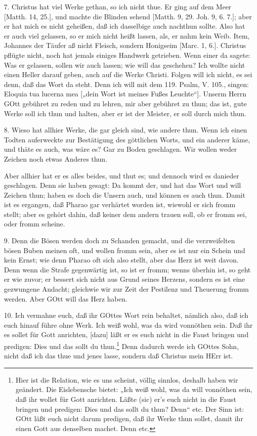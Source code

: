7. Christus hat viel Werke gethan, so ich nicht thue. Er ging auf dem Meer [Matth. 14, 25.], und machte die Blinden sehend [Matth. 9, 29. Joh. 9, 6. 7.]; aber er hat mich es nicht geheißen, daß ich dasselbige auch nachthun sollte. Also hat er auch viel gelassen, so er mich nicht heißt lassen, als, er nahm kein Weib. Item, Johannes der Täufer aß nicht Fleisch, sondern Honigseim [Marc. 1, 6.]. Christus pflügte nicht, noch hat jemals einiges Handwerk getrieben. Wenn einer da sagete: Was er gelassen, sollen wir auch lassen; wie will das geschehen? Ich wollte nicht einen Heller darauf geben, auch auf die Werke Christi. Folgen will ich nicht, es sei denn, daß das Wort da steht. Denn ich will mit dem 119. Psalm, V. 105., singen: Eloquia tua lucerna mea [„dein Wort ist meines Fußes Leuchte“]. Unserm Herrn GOtt gebühret zu reden und zu lehren, mir aber gebühret zu thun; das ist, gute Werke soll ich thun und halten, aber er ist der Meister, er soll durch mich thun.

8. Wieso hat allhier Werke, die gar gleich sind, wie andere thun. Wenn ich einen Todten auferweckte zur Bestätigung des göttlichen Worts, und ein anderer käme, und thäte es auch, was wäre es? Gar zu Boden geschlagen. Wir wollen weder Zeichen noch etwas Anderes thun.

Aber allhier hat er es alles beides, und thut es; und dennoch wird es danieder geschlagen. Denn sie haben gesagt: Da kommt der, und hat das Wort und will Zeichen thun; haben es doch die Unsern auch, und können es auch thun. Damit ist es ergangen, daß Pharao gar verhärtet worden ist, wiewohl er sich fromm stellt; aber es gehört dahin, daß keiner dem andern trauen soll, ob er fromm sei, oder fromm scheine.

9. Denn die Bösen werden doch zu Schanden gemacht, und die verzweifelten bösen Buben meinen oft, und wollen fromm sein, aber es ist nur ein Schein und kein Ernst; wie denn Pharao oft sich also stellt, aber das Herz ist weit davon. Denn wenn die Strafe gegenwärtig ist, so ist er fromm; wenns überhin ist, so geht er wie zuvor; er bessert sich nicht aus Grund seines Herzens, sondern es ist eine gezwungene Andacht; gleichwie wir zur Zeit der Pestilenz und Theuerung fromm werden. Aber GOtt will das Herz haben.

10. Ich vermahne euch, daß ihr GOttes Wort rein behaltet, nämlich also, daß ich euch hinauf führe ohne Werk. Ich weiß wohl, was da wird vonnöthen sein. Daß ihr es sollet für Gott anrichten, [dazu] läßt er es euch nicht in die Faust bringen und predigen: Dies und das sollt du thun.\footnote{Hier ist die Relation, wie es uns scheint, völlig sinnlos, deshalb haben wir geändert. Die Eislebensche bietet: „Ich weiß wohl, was da will vonnöthen sein, daß ihr wollet für Gott anrichten. Läßte (sic) er's euch nicht in die Faust bringen und predigen: Dies und das sollt du thun? Denn“ etc. Der Sinn ist: GOtt läßt euch nicht darum predigen, daß ihr Werke thun sollet, damit ihr einen Gott aus denselben machet. Denn etc.} Denn dadurch werde ich GOttes Sohn, nicht daß ich das thue und jenes lasse, sondern daß Christus mein HErr ist.

